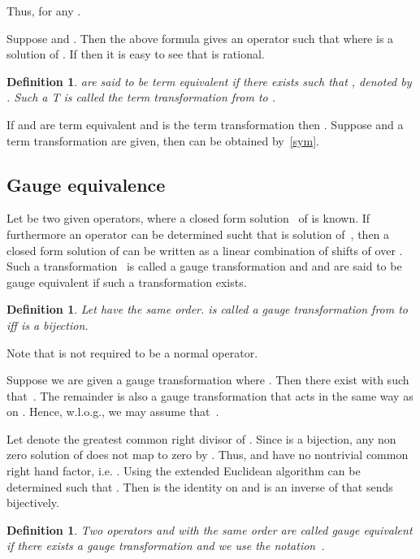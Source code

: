 \documentclass{article}
\newtheorem{definition}[theorem]{Definition}
\begin{document}
Thus,  for any .


Suppose  and . Then the above formula gives an operator  such that  
where  is a solution of . If  then it is easy to see that  is rational.


\begin{definition}
   are said to be term equivalent if there exists  such that
  , denoted by . Such a T is called the term
  transformation from  to .
\end{definition}

If  and  are term equivalent and  is the term transformation then
.  Suppose  and a term
transformation  are given, then  can be obtained by~\eqref{sym}.

\subsection{Gauge equivalence}\label{sec:ge}
Let  be two given operators, where a closed form solution~ of  is
known. If furthermore an operator  can be determined sucht that  is solution
of~, then a closed form solution of  can be written as a linear combination of
shifts of  over . Such a transformation~ is called a gauge transformation and
 and  are said to be gauge equivalent if such a transformation exists.




\begin{definition}\label{def:gt}
  Let  have the same order.  is called a {\em gauge
    transformation} from  to  iff  is a bijection.
\end{definition}

Note that  is not required to be a normal operator.  

Suppose we are given a gauge transformation  where . Then there exist 
with  such that~. The remainder  is
also a gauge transformation that acts in the same way as  on . Hence, 
w.l.o.g., we may assume that~.

Let  denote the greatest common right divisor of .  
Since  is a bijection, any non zero solution  of  does not map to zero by . Thus,  and  have no nontrivial common right hand factor, i.e. . 
Using the extended Euclidean algorithm  can be determined such
that . Then  is the identity on  and
 is an inverse of  that sends  bijectively.

\begin{definition}\label{def:ge}
  Two operators  and  with the same order are called gauge equivalent if there
  exists a gauge transformation  and we use the notation~.
\end{definition}
\end{document}
